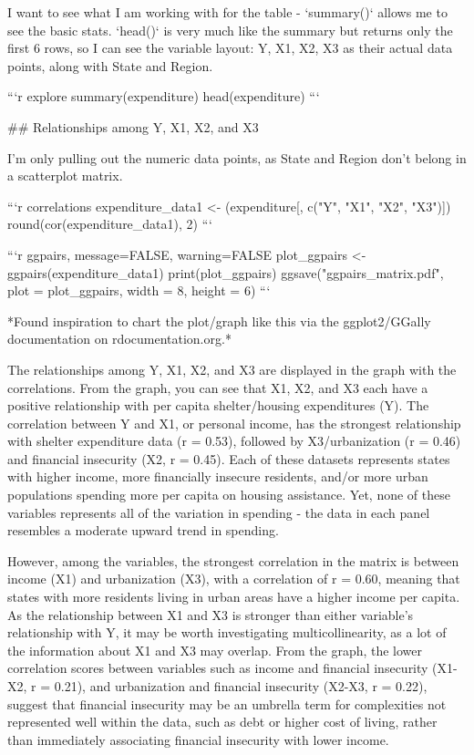 I want to see what I am working with for the table - `summary()` allows me to see the basic stats. `head()` is very much like the summary but returns only the first 6 rows, so I can see the variable layout: Y, X1, X2, X3 as their actual data points, along with State and Region.

```{r explore}
summary(expenditure)
head(expenditure)
```

## Relationships among Y, X1, X2, and X3

I’m only pulling out the numeric data points, as State and Region don’t belong in a scatterplot matrix.

```{r correlations}
expenditure_data1 <- (expenditure[, c("Y", "X1", "X2", "X3")])
round(cor(expenditure_data1), 2)
```

```{r ggpairs, message=FALSE, warning=FALSE}
plot_ggpairs <- ggpairs(expenditure_data1)
print(plot_ggpairs)
ggsave("ggpairs_matrix.pdf", plot = plot_ggpairs, width = 8, height = 6)
```

*Found inspiration to chart the plot/graph like this via the ggplot2/GGally documentation on rdocumentation.org.*

The relationships among Y, X1, X2, and X3 are displayed in the graph with the correlations. From the graph, you can see that X1, X2, and X3 each have a positive relationship with per capita shelter/housing expenditures (Y). The correlation between Y and X1, or personal income, has the strongest relationship with shelter expenditure data (r = 0.53), followed by X3/urbanization (r = 0.46) and financial insecurity (X2, r = 0.45). Each of these datasets represents states with higher income, more financially insecure residents, and/or more urban populations spending more per capita on housing assistance. Yet, none of these variables represents all of the variation in spending - the data in each panel resembles a moderate upward trend in spending.

However, among the variables, the strongest correlation in the matrix is between income (X1) and urbanization (X3), with a correlation of r = 0.60, meaning that states with more residents living in urban areas have a higher income per capita. As the relationship between X1 and X3 is stronger than either variable’s relationship with Y, it may be worth investigating multicollinearity, as a lot of the information about X1 and X3 may overlap. From the graph, the lower correlation scores between variables such as income and financial insecurity (X1-X2, r = 0.21), and urbanization and financial insecurity (X2-X3, r = 0.22), suggest that financial insecurity may be an umbrella term for complexities not represented well within the data, such as debt or higher cost of living, rather than immediately associating financial insecurity with lower income.

